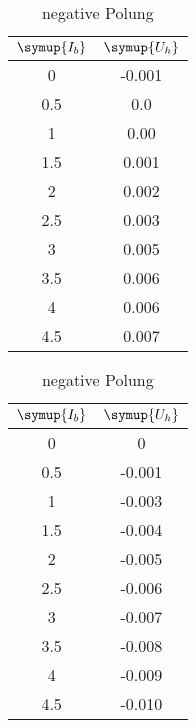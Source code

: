 \vspace{-2cm}

  \begin{table}[!ht]
    \caption*{\textbf{Hallspannung; Strom $\symup{I_q}$ konstant}}
    \begin{minipage}{0.49\textwidth}
          \centering  
          \caption{positive Polung}
          \label{tab:bconst}
          \begin{tabular}{c c}
            \toprule
            $\symup{I_b}$ & $\symup{U_h}$ \\
            \midrule
             0   & -0.001 \\
             0.5 &  0.0 \\
             1   &  0.00 \\
             1.5 &  0.001 \\
             2   &  0.002 \\
             2.5 &  0.003 \\
             3   &  0.005 \\
             3.5 &  0.006 \\
             4   &  0.006 \\
             4.5 &  0.007 \\
            \bottomrule
        \end{tabular}
    \end{minipage}
    \hfill
    \begin{minipage}{0.49\textwidth}
        \centering
          \caption{negative Polung}
          \label{tab:bconst-}
           \begin{tabular}{c c}
            \toprule
            $\symup{I_b}$ & $\symup{U_h}$ \\
            \midrule
              0   &  0 \\
             0.5 & -0.001 \\
            1   & -0.003 \\
            1.5 & -0.004 \\
            2   & -0.005 \\
            2.5 & -0.006 \\
            3   & -0.007 \\
            3.5 & -0.008 \\
            4   & -0.009 \\
            4.5 & -0.010 \\
            \bottomrule
       \end{tabular}
     \end{minipage}
  \end{table}

